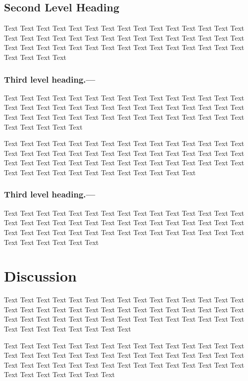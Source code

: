 \documentclass[oupdraft]{sysbio}
\begin{document}
\subsection{Second Level Heading}

Text Text Text Text Text Text Text Text Text Text Text Text Text Text Text Text Text Text Text Text Text Text Text Text Text Text Text Text Text Text Text Text Text Text Text Text Text Text Text Text Text Text Text Text Text Text Text Text Text

\subsubsection{Third level heading.---}Text Text Text Text Text Text Text Text Text Text Text Text Text Text Text Text Text Text Text Text Text Text Text Text Text Text Text Text Text Text Text Text Text Text Text Text Text Text Text Text Text Text Text Text Text Text Text Text Text Text

Text Text Text Text Text Text Text Text Text Text Text Text Text Text Text Text Text Text Text Text Text Text Text Text Text Text Text Text Text Text Text Text Text Text Text Text Text Text Text Text Text Text Text Text Text Text Text Text Text Text Text Text Text Text Text Text Text

\subsubsection{Third level heading.---}Text Text Text Text Text Text Text Text Text Text Text Text Text Text Text Text Text Text Text Text Text Text Text Text Text Text Text Text Text Text Text Text Text Text Text Text Text Text Text Text Text Text Text Text Text Text Text Text Text Text Text

\bigskip

\section{Discussion}
\label{sec4}

Text Text Text Text Text Text Text Text Text Text Text Text Text Text Text Text Text Text Text Text Text Text Text Text Text Text Text Text Text Text Text Text Text Text Text Text Text Text Text Text Text Text Text Text Text Text Text Text Text Text Text Text Text

Text Text Text Text Text Text Text Text Text Text Text Text Text Text Text Text Text Text Text Text Text Text Text Text Text Text Text Text Text Text Text Text Text Text Text Text Text Text Text Text Text Text Text Text Text Text Text Text Text Text Text Text
\end{document}
